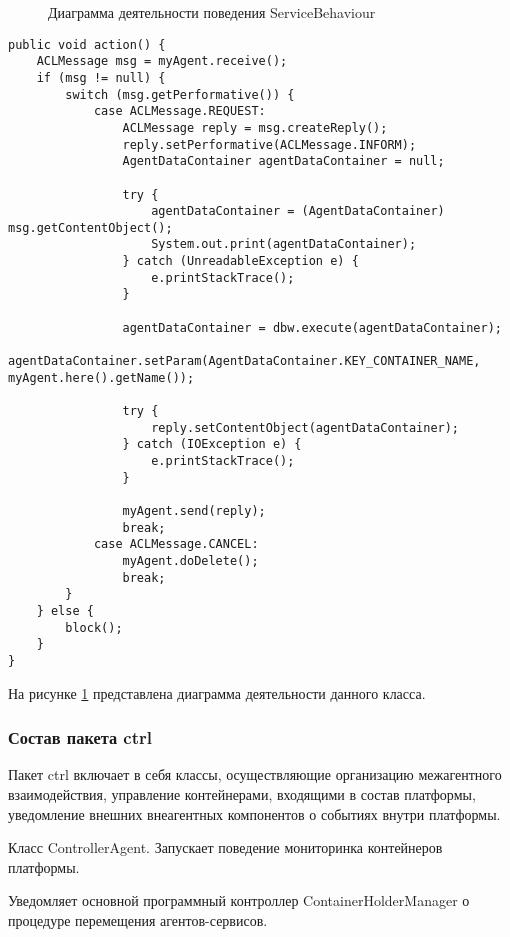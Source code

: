 \begin{figure}[h!]
\caption{Диаграмма деятельности поведения ServiceBehaviour}
\label{3:service-beh}
\end{figure}
\begin{lstlisting}
public void action() {
    ACLMessage msg = myAgent.receive();
    if (msg != null) {
        switch (msg.getPerformative()) {
            case ACLMessage.REQUEST:
                ACLMessage reply = msg.createReply();
                reply.setPerformative(ACLMessage.INFORM);
                AgentDataContainer agentDataContainer = null;

                try {
                    agentDataContainer = (AgentDataContainer) msg.getContentObject();
                    System.out.print(agentDataContainer);
                } catch (UnreadableException e) {
                    e.printStackTrace();
                }

                agentDataContainer = dbw.execute(agentDataContainer);
                agentDataContainer.setParam(AgentDataContainer.KEY_CONTAINER_NAME, myAgent.here().getName());

                try {
                    reply.setContentObject(agentDataContainer);
                } catch (IOException e) {
                    e.printStackTrace();
                }

                myAgent.send(reply);
                break;
            case ACLMessage.CANCEL:
                myAgent.doDelete();
                break;
        }
    } else {
        block();
    }
}
\end{lstlisting}

На рисунке \ref{3:service-beh} представлена диаграмма деятельности данного класса.

\subsubsection{Состав пакета ctrl}
Пакет ctrl включает в себя классы, осуществляющие организацию межагентного взаимодействия, управление контейнерами, входящими в состав платформы, уведомление внешних внеагентных компонентов о событиях внутри платформы.

Класс ControllerAgent. Запускает поведение мониторинка контейнеров платформы.

Уведомляет основной программный контроллер ContainerHolderManager о процедуре перемещения агентов-сервисов.

